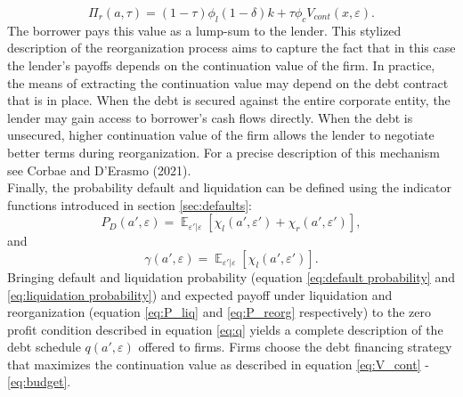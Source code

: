 \documentclass[12pt]{article}
\DeclareMathOperator{\E}{\mathbb{E}}
\begin{document}
\begin{equation}  \label{eq:P_reorg}
   \Pi_{r}(a,\tau) = (1-\tau) \phi_l (1-\delta) k +\tau \phi_c V_{cont} (x, \varepsilon).
\end{equation}
The borrower pays this value as a lump-sum to the lender. This stylized description of the reorganization process aims to capture the fact that in this case the lender's payoffs depends on the continuation value of the firm.  In practice, the means of extracting the continuation value may depend on the debt contract that is in place. When the debt is secured against the entire corporate entity, the lender may gain access to borrower's cash flows directly. When the debt is unsecured, higher continuation value of the firm allows the lender to negotiate better terms during reorganization. For a precise description of this mechanism see Corbae and D'Erasmo (2021). \vspace{3mm} \\
Finally, the probability default and liquidation can be defined using the indicator functions introduced in section \ref{sec:defaults}: 
\begin{equation} \label{eq:default probability}
    P_D(a',\varepsilon) = \E_{\varepsilon'|\varepsilon}[\chi_l(a',\varepsilon') + \chi_r(a',\varepsilon')],
\end{equation}
and
\begin{equation} \label{eq:liquidation probability}
    \gamma(a',\varepsilon) = \E_{\varepsilon' |\varepsilon}[\chi_l(a',\varepsilon')].
\end{equation}
Bringing default and liquidation probability (equation \ref{eq:default probability} and \ref{eq:liquidation probability}) and expected payoff under liquidation and reorganization (equation \ref{eq:P_liq} and \ref{eq:P_reorg} respectively) to the zero profit condition described in equation \ref{eq:q} yields a complete description of the debt schedule $q(a', \varepsilon)$ offered to firms. Firms choose the debt financing strategy that maximizes the continuation value as described in equation \ref{eq:V_cont} - \ref{eq:budget}.
\end{document}

